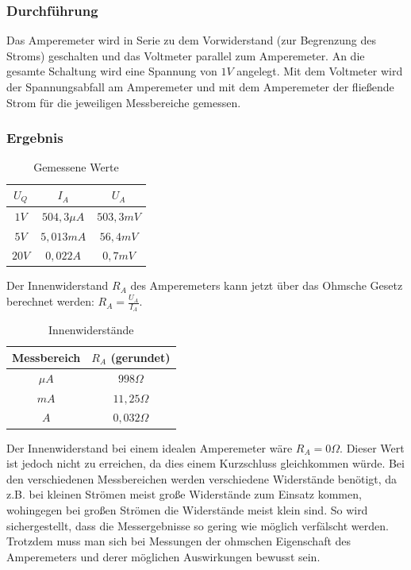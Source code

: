 \documentclass[12pt,a4paper,titlepage]{article}
\begin{document}
\subsubsection{Durchführung}
Das Amperemeter wird in Serie zu dem Vorwiderstand (zur Begrenzung des Stroms) geschalten und das Voltmeter parallel zum Amperemeter. An die gesamte Schaltung wird eine Spannung von $1V$ angelegt. Mit dem Voltmeter wird der Spannungsabfall am Amperemeter und mit dem Amperemeter der fließende Strom für die jeweiligen Messbereiche gemessen.

\subsubsection{Ergebnis}
\begin{table}[H]
  \centering
  \begin{tabular}{|c|c|c|}
    \hline
    $U_Q$ & $I_A$ & $U_A$ \\
    \hline
    $1V$ & $504,3\mu A$ & $503,3mV$ \\
    \hline
    $5V$ & $5,013mA$ & $56,4mV$ \\
    \hline
    $20V$ & $0,022A$ & $0,7mV$ \\
    \hline
  \end{tabular}
  \caption{Gemessene Werte}
\end{table}

\noindent Der Innenwiderstand $R_A$ des Amperemeters kann jetzt über das Ohmsche Gesetz berechnet werden: $R_A = \frac{U_A}{I_A}$.

\begin{table}[H]
  \centering
  \begin{tabular}{|c|c|}
  \hline
  Messbereich & $R_A$ (gerundet) \\
  \hline
  $\mu A$ & $998\Omega$ \\
  \hline
  $mA$ & $11,25\Omega$ \\
  \hline
  $A$ & $0,032\Omega$ \\
  \hline
  \end{tabular}
  \caption{Innenwiderstände}
\end{table}

\noindent Der Innenwiderstand bei einem idealen Amperemeter wäre $R_A = 0\Omega$. Dieser Wert ist jedoch nicht zu erreichen, da dies einem Kurzschluss gleichkommen würde. Bei den verschiedenen Messbereichen werden verschiedene Widerstände benötigt, da z.B. bei kleinen Strömen meist große Widerstände zum Einsatz kommen, wohingegen bei großen Strömen die Widerstände meist klein sind. So wird sichergestellt, dass die Messergebnisse so gering wie möglich verfälscht werden. Trotzdem muss man sich bei Messungen der ohmschen Eigenschaft des Amperemeters und derer möglichen Auswirkungen bewusst sein.
\end{document}
